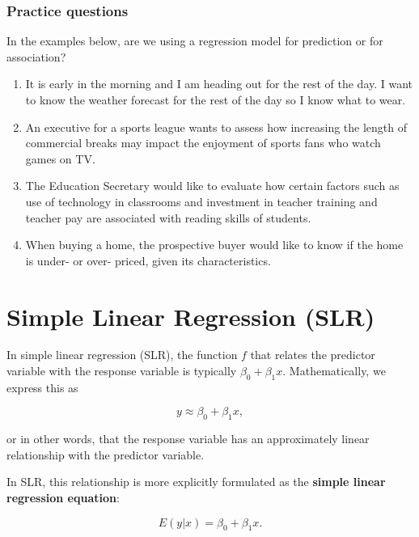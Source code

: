 \documentclass[
]{book}
\begin{document}
\subsubsection{Practice questions}\label{practice-questions}

In the examples below, are we using a regression model for prediction or for association?

\begin{enumerate}
\def\labelenumi{\arabic{enumi}.}
\item
  It is early in the morning and I am heading out for the rest of the day. I want to know the weather forecast for the rest of the day so I know what to wear.
\item
  An executive for a sports league wants to assess how increasing the length of commercial breaks may impact the enjoyment of sports fans who watch games on TV.
\item
  The Education Secretary would like to evaluate how certain factors such as use of technology in classrooms and investment in teacher training and teacher pay are associated with reading skills of students.
\item
  When buying a home, the prospective buyer would like to know if the home is under- or over- priced, given its characteristics.
\end{enumerate}

\section{Simple Linear Regression (SLR)}\label{simple-linear-regression-slr}

In simple linear regression (SLR), the function \(f\) that relates the predictor variable with the response variable is typically \(\beta_0 + \beta_1 x\). Mathematically, we express this as

\[
y \approx \beta_0 + \beta_1 x,
\]

or in other words, that the response variable has an approximately linear relationship with the predictor variable.

In SLR, this relationship is more explicitly formulated as the \textbf{simple linear regression equation}:

\begin{equation} 
E(y|x)=\beta_0+\beta_{1}x.
\label{eq:SLR}
\end{equation}
\end{document}
